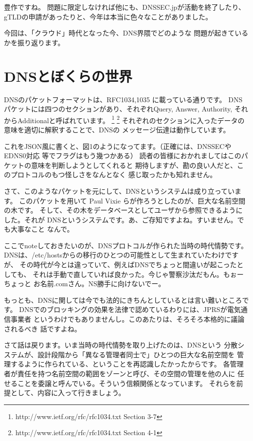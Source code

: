 豊作ですね。
問題に限定しなければ他にも、DNSSEC.jpが活動を終了したり、
gTLDの申請があったりと、今年は本当に色々なことがありました。

今回は、「クラウド」時代となった今、DNS界隈でどのような
問題が起きているかを振り返ります。

\section{DNSとぼくらの世界}

DNSのパケットフォーマットは、RFC1034,1035 に載っている通りです。
DNSパケットには四つのセクションがあり、それぞれQuery, Answer, Authority,
それからAdditionalと呼ばれています。
\footnote{http://www.ietf.org/rfc/rfc1034.txt Section 3-7}
\footnote{http://www.ietf.org/rfc/rfc1034.txt Section 4-1}
それぞれのセクションに入ったデータの意味を適切に解釈することで、DNSの
メッセージ伝達は動作しています。

これをJSON風に書くと、図1のようになってます。（正確には、DNSSECやEDNS0対応
等でフラグはもう幾つかある）
読者の皆様におかれましてはこのパケットの意味を判断しようとしてくれると
期待しますが、勘の良い人だと、このプロトコルのもつ怪しさをなんとなく
感じ取ったかも知れません。

さて、このようなパケットを元にして、DNSというシステムは成り立っています。
このパケットを用いて Paul Vixie らが作ろうとしたのが、巨大な名前空間の木です。
そして、その木をデータベースとしてユーザから参照できるようにした。それが
DNSというシステムです。あ、ご存知ですよね。すいません。でも大事なこと
なんで。

ここでnoteしておきたいのが、DNSプロトコルが作られた当時の時代情勢です。
DNSは、/etc/hostsからの移行のひとつの可能性として生まれていたわけですが、
その時代が今とは違っていて、例えばDNSでちょっと間違いが起こったとしても、
それは手動で直していれば良かった。今じゃ警察沙汰だもん。もぉーちょっと
お名前.comさん。NS勝手に向けないでー。

もっとも、DNSに関しては今でも法的にきちんとしているとは言い難いところです。
DNSでのブロッキングの効果を法律で認めているわりには、JPRSが電気通信事業者
というわけでもありませんし。このあたりは、そろそろ本格的に議論されるべき
話ですよね。

さて話は戻ります。いま当時の時代情勢を取り上げたのは、DNSという
分散システムが、設計段階から「異なる管理者同士で」ひとつの巨大な名前空間を
管理するように作られている、ということを再認識したかったからです。
各管理者が責任を持つ名前空間の範囲をゾーンと呼び、その空間の管理を他の人に
任せることを委譲と呼んでいる。そういう信頼関係となっています。
それらを前提として、内容に入って行きましょう。


